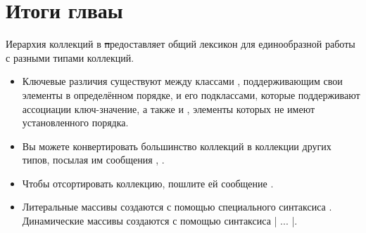 \documentclass[a4paper,10pt,twoside]{book}
\begin{document}
\section{Итоги глваы}

Иерархия коллекций в \st предоставляет общий лексикон для единообразной работы с разными типами коллекций.

\begin{itemize}
  \item Ключевые различия существуют между классами , поддерживающим свои элементы в определённом порядке,  и его подклассами, которые поддерживают ассоциации ключ-значение, а также  и , элементы которых не имеют установленного порядка.
  \item Вы можете конвертировать большинство коллекций в коллекции других типов, посылая им сообщения ,  \etc.
  \item Чтобы отсортировать коллекцию, пошлите ей сообщение .
  \item Литеральные массивы создаются с помощью специального синтаксиса . Динамические массивы создаются с помощью синтаксиса \ct|{ ... }|.

\end{itemize}
\end{document}
